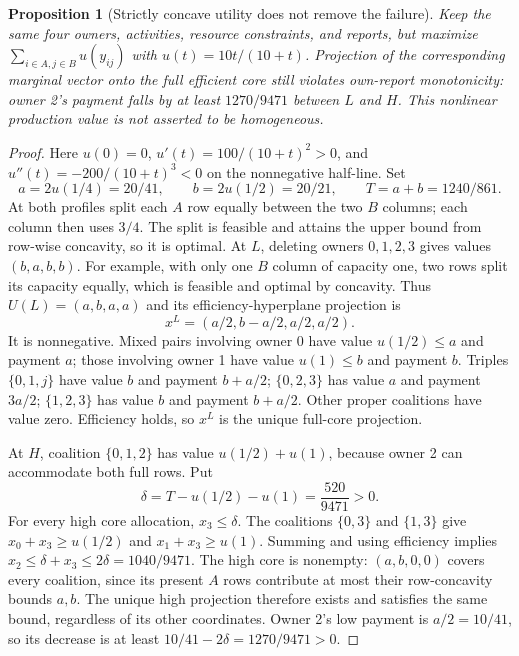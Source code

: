 \documentclass[11pt]{article}
\newtheorem{proposition}[theorem]{Proposition}
\theoremstyle{definition}\newtheorem{definition}[theorem]{Definition}
\theoremstyle{remark}\newtheorem{remark}[theorem]{Remark}
\begin{document}
\begin{proposition}[Strictly concave utility does not remove the failure]
\label{net:concave-projection}
Keep the same four owners, activities, resource constraints, and reports,
but maximize $\sum_{i\in A,j\in B}u(y_{ij})$ with
$u(t)=10t/(10+t)$.  Projection of the corresponding marginal vector onto
the full efficient core still violates own-report monotonicity: owner 2's
payment falls by at least $1270/9471$ between $L$ and $H$.
This nonlinear production value is not asserted to be homogeneous.
\end{proposition}
\begin{proof}
Here $u(0)=0$, $u'(t)=100/(10+t)^2>0$, and
$u''(t)=-200/(10+t)^3<0$ on the nonnegative half-line.
Set
\[
 a=2u(1/4)=20/41,\qquad b=2u(1/2)=20/21,\qquad
 T=a+b=1240/861.
\]
At both profiles split each $A$ row equally between the two $B$ columns;
each column then uses $3/4$.  The split is feasible and attains the upper
bound from row-wise concavity, so it is optimal.
At $L$, deleting owners $0,1,2,3$ gives values $(b,a,b,b)$.
For example, with only one $B$ column of capacity one, two rows split its
capacity equally, which is feasible and optimal by concavity.
Thus $U(L)=(a,b,a,a)$ and its efficiency-hyperplane projection is
\[
 x^L=(a/2,b-a/2,a/2,a/2).
\]
It is nonnegative.  Mixed pairs involving owner 0 have value $u(1/2)\le a$
and payment $a$; those involving owner 1 have value $u(1)\le b$ and payment
$b$.  Triples $\{0,1,j\}$ have value $b$ and payment $b+a/2$;
$\{0,2,3\}$ has value $a$ and payment $3a/2$;
$\{1,2,3\}$ has value $b$ and payment $b+a/2$.
Other proper coalitions have value zero.  Efficiency holds, so $x^L$ is the
unique full-core projection.

At $H$, coalition $\{0,1,2\}$ has value $u(1/2)+u(1)$, because owner 2
can accommodate both full rows.  Put
\[
 \delta=T-u(1/2)-u(1)=\frac{520}{9471}>0.
\]
For every high core allocation, $x_3\le\delta$.
The coalitions $\{0,3\}$ and $\{1,3\}$ give
$x_0+x_3\ge u(1/2)$ and $x_1+x_3\ge u(1)$.
Summing and using efficiency implies
$x_2\le\delta+x_3\le2\delta=1040/9471$.
The high core is nonempty: $(a,b,0,0)$ covers every coalition, since its
present $A$ rows contribute at most their row-concavity bounds $a,b$.
The unique high projection therefore exists and satisfies the same bound,
regardless of its other coordinates.  Owner 2's low payment is
$a/2=10/41$, so its decrease is at least
$10/41-2\delta=1270/9471>0$.
\end{proof}
\end{document}
